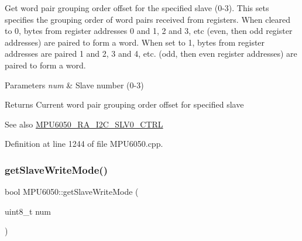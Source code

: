 Get word pair grouping order offset for the specified slave (0-\/3). This sets specifies the grouping order of word pairs received from registers. When cleared to 0, bytes from register addresses 0 and 1, 2 and 3, etc (even, then odd register addresses) are paired to form a word. When set to 1, bytes from register addresses are paired 1 and 2, 3 and 4, etc. (odd, then even register addresses) are paired to form a word.


\begin{DoxyParams}{Parameters}
{\em num} & Slave number (0-\/3) \\
\hline
\end{DoxyParams}
\begin{DoxyReturn}{Returns}
Current word pair grouping order offset for specified slave 
\end{DoxyReturn}
\begin{DoxySeeAlso}{See also}
\mbox{\hyperlink{MPU6050_8h_a70ce4d71982a1e3fb2be9b71f40da786}{M\+P\+U6050\+\_\+\+R\+A\+\_\+\+I2\+C\+\_\+\+S\+L\+V0\+\_\+\+C\+T\+RL}} 
\end{DoxySeeAlso}


Definition at line 1244 of file M\+P\+U6050.\+cpp.


\begin{DoxyCode}{0}

\end{DoxyCode}
\mbox{\label{classMPU6050_adb99955fa66300b1f0bedfcdd8187412}} 
\subsubsection{\texorpdfstring{getSlaveWriteMode()}{getSlaveWriteMode()}}
{\footnotesize\ttfamily bool M\+P\+U6050\+::get\+Slave\+Write\+Mode (\begin{DoxyParamCaption}\item[{uint8\+\_\+t}]{num }\end{DoxyParamCaption})}

